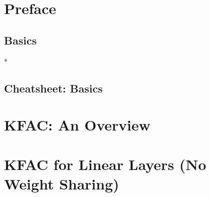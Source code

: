 \documentclass{article}
\begin{document}

\onecolumn


\clearpage


\clearpage

\setcounter{tocdepth}{2}
\tableofcontents
\clearpage

\section{Preface}\label{sec:preface}

\clearpage

\begin{paracol}{2}
  \section{Basics}\label{sec:basics}
  
  \switchcolumn[0]*
\end{paracol}
\clearpage

\begin{paracol}{1}
  \section{Cheatsheet: Basics}\label{sec:cheatsheet-basics}
  
\end{paracol}
\clearpage

\begin{paracol}{2}
  \section{KFAC: An Overview}\label{sec:kfac-overview}
  
  \clearpage

  \section{KFAC for Linear Layers (No Weight Sharing)}\label{sec:kfac-linear}
  




\end{paracol}
\clearpage
\end{document}
